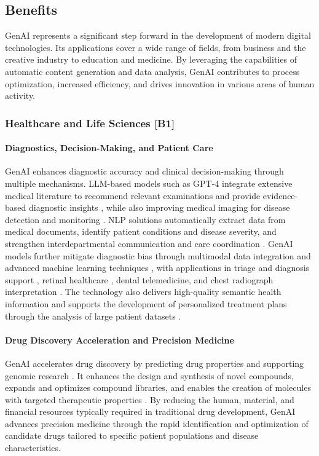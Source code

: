 \subsection{Benefits}

GenAI represents a significant step forward in the development of modern digital technologies. Its applications cover a wide range of fields, from business and the creative industry to education and medicine. By leveraging the capabilities of automatic content generation and data analysis, GenAI contributes to process optimization, increased efficiency, and drives innovation in various areas of human activity.

\subsubsection{Healthcare and Life Sciences [B1]}
\paragraph{Diagnostics, Decision-Making, and Patient Care}
GenAI enhances diagnostic accuracy and clinical decision-making through multiple mechanisms. LLM-based models such as GPT-4 integrate extensive medical literature to recommend relevant examinations and provide evidence-based diagnostic insights \parencite{S01}, while also improving medical imaging for disease detection and monitoring \parencite{R09}. NLP solutions automatically extract data from medical documents, identify patient conditions and disease severity, and strengthen interdepartmental communication and care coordination \parencite{S10}. GenAI models further mitigate diagnostic bias through multimodal data integration and advanced machine learning techniques \parencite{S16}, with applications in triage and diagnosis support \parencite{S02}, retinal healthcare \parencite{S03}, dental telemedicine, and chest radiograph interpretation \parencite{S17}. The technology also delivers high-quality semantic health information \parencite{S11} and supports the development of personalized treatment plans through the analysis of large patient datasets \parencite{S16}.

\paragraph{Drug Discovery Acceleration and Precision Medicine}
GenAI accelerates drug discovery by predicting drug properties and supporting genomic research \parencite{S01}. It enhances the design and synthesis of novel compounds, expands and optimizes compound libraries, and enables the creation of molecules with targeted therapeutic properties \parencite{S16}. By reducing the human, material, and financial resources typically required in traditional drug development, GenAI advances precision medicine through the rapid identification and optimization of candidate drugs tailored to specific patient populations and disease characteristics.

